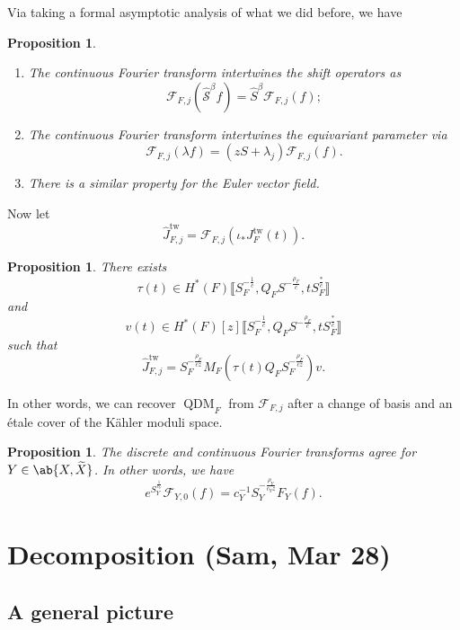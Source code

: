 \documentclass[leqno, openany]{memoir}
\newtheorem{prop}[thm]{Proposition}
\theoremstyle{definition}
\theoremstyle{remark}
\theoremstyle{plain}
\theoremstyle{definition}
\theoremstyle{remark}
\newcommand{\mc}[1]{\mathcal{#1}}
\newcommand{\mr}[1]{\mathrm{#1}}
\newcommand{\wt}[1]{\widetilde{#1}}
\newcommand{\wh}[1]{\widehat{#1}}
\DeclareMathOperator{\QDM}{QDM}
\begin{document}
Via taking a formal asymptotic analysis of what we did before, we have
\begin{prop}\leavevmode
    \begin{enumerate}
        \item The continuous Fourier transform intertwines the shift operators as
            \[ \mc{F}_{F,j}(\wh{\mc{S}}^{\beta} f) = \wh{S}^{\beta} \mc{F}_{F,j}(f); \]
        \item The continuous Fourier transform intertwines the equivariant parameter via
            \[ \mc{F}_{F,j}(\lambda f) = (z S + \lambda_j) \mc{F}_{F,j}(f). \]
        \item There is a similar property for the Euler vector field.
    \end{enumerate}
\end{prop}

Now let
\[ \wh{J}_{F,j}^{\mr{tw}} = \mc{F}_{F,j} (\iota_* J_F^{\mr{tw}}(t)). \]

\begin{prop}\label{prop:twisted}
    There exists 
    \[ \tau(t) \in H^*(F) \llbracket S_F^{-\frac{1}{c}}, Q_F S^{-\frac{\rho_F}{c}}, tS_F^{\frac{*}{c}} \rrbracket \]
    and
    \[ v(t) \in H^*(F) [z] \llbracket S_F^{-\frac{1}{c}}, Q_F S^{-\frac{\rho_F}{c}}, tS_F^{\frac{*}{c}} \rrbracket \]
    such that 
    \[ \wh{J}_{F,j}^{\mr{tw}} = S_F^{-\frac{\rho_F}{cz}} M_F(\tau(t) Q_F S_F^{-\frac{\rho_F}{cz}}) v. \]
\end{prop}

In other words, we can recover $\QDM_F$ from $\mc{F}_{F,j}$ after a change of basis and an \'etale cover of the K\"ahler moduli space.

\begin{prop}
    The discrete and continuous Fourier transforms agree for $Y \in \ab\{X, \wt{X} \}$. In other words, we have
    \[ e^{S_Y^{\frac{1}{c_Y}}} \mc{F}_{Y,0}(f) = c_Y^{-1} S_Y^{-\frac{\rho_Y}{c_Y z}} F_Y(f). \]
\end{prop}



\section{Decomposition (Sam, Mar 28)}%
\label{sec:Decomposition}

\subsection{A general picture}%
\label{sub:A general picture}
\end{document}
